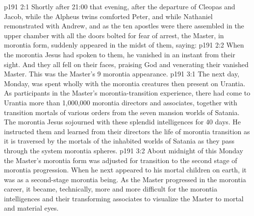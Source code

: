 \vs p191 2:1 Shortly after 21:00 that evening, after the departure of Cleopas and Jacob, while the Alpheus twins comforted Peter, and while Nathaniel remonstrated with Andrew, and as the ten apostles were there assembled in the upper chamber with all the doors bolted for fear of arrest, the Master, in morontia form, suddenly appeared in the midst of them, saying: 
\vs p191 2:2 When the morontia Jesus had spoken to them, he vanished in an instant from their sight. And they all fell on their faces, praising God and venerating their vanished Master. This was the Master’s 9 morontia appearance.
\vs p191 3:1 The next day, Monday, was spent wholly with the morontia creatures then present on Urantia. As participants in the Master’s morontia\hyp{}transition experience, there had come to Urantia more than 1,000,000 morontia directors and associates, together with transition mortals of various orders from the seven mansion worlds of Satania. The morontia Jesus sojourned with these splendid intelligences for 40 days. He instructed them and learned from their directors the life of morontia transition as it is traversed by the mortals of the inhabited worlds of Satania as they pass through the system morontia spheres.
\vs p191 3:2 About midnight of this Monday the Master’s morontia form was adjusted for transition to the second stage of morontia progression. When he next appeared to his mortal children on earth, it was as a second\hyp{}stage morontia being. As the Master progressed in the morontia career, it became, technically, more and more difficult for the morontia intelligences and their transforming associates to visualize the Master to mortal and material eyes.
